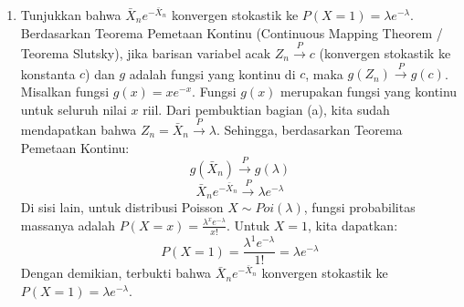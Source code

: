 \documentclass[11pt,letterpaper]{article}
\begin{document}
\begin{enumerate}
\begin{enumerate}[label=\alph*)]
    \item Tunjukkan bahwa $\bar{X}_n e^{-\bar{X}_n}$ konvergen stokastik ke $P(X=1) = \lambda e^{-\lambda}$. \\
    Berdasarkan Teorema Pemetaan Kontinu (Continuous Mapping Theorem / Teorema Slutsky), jika barisan variabel acak $Z_n \xrightarrow{P} c$ (konvergen stokastik ke konstanta $c$) dan $g$ adalah fungsi yang kontinu di $c$, maka $g(Z_n) \xrightarrow{P} g(c)$. \\
    Misalkan fungsi $g(x) = x e^{-x}$. Fungsi $g(x)$ merupakan fungsi yang kontinu untuk seluruh nilai $x$ riil.
    Dari pembuktian bagian (a), kita sudah mendapatkan bahwa $Z_n = \bar{X}_n \xrightarrow{P} \lambda$.
    Sehingga, berdasarkan Teorema Pemetaan Kontinu:
    \[ g(\bar{X}_n) \xrightarrow{P} g(\lambda) \]
    \[ \bar{X}_n e^{-\bar{X}_n} \xrightarrow{P} \lambda e^{-\lambda} \]
    Di sisi lain, untuk distribusi Poisson $X \sim Poi(\lambda)$, fungsi probabilitas massanya adalah $P(X=x) = \frac{\lambda^x e^{-\lambda}}{x!}$.
    Untuk $X = 1$, kita dapatkan:
    \[ P(X=1) = \frac{\lambda^1 e^{-\lambda}}{1!} = \lambda e^{-\lambda} \]
    Dengan demikian, terbukti bahwa $\bar{X}_n e^{-\bar{X}_n}$ konvergen stokastik ke $P(X=1) = \lambda e^{-\lambda}$.
  \end{enumerate}
\end{enumerate}
\end{document}
